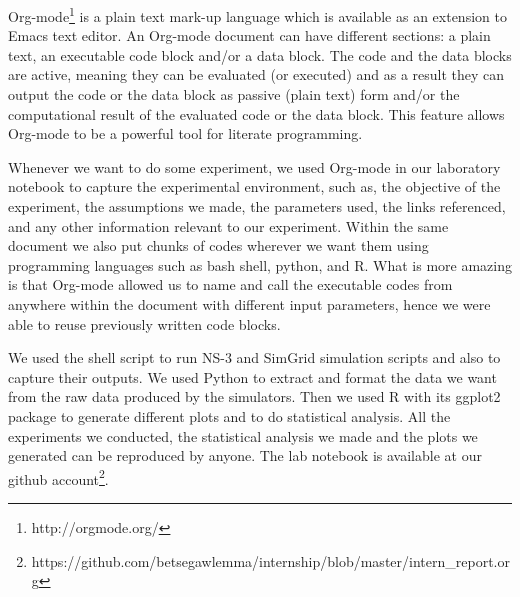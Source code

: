 Org-mode\footnote{http://orgmode.org/} is a plain text mark-up language which is available as an extension to Emacs text editor. An Org-mode document can have different sections: a plain text, an executable code block and/or a data block. The code and the data blocks are active, meaning they can be evaluated (or executed) and as a result they can output the code or the data block as passive (plain text) form and/or the computational result of the evaluated code or the data block. This feature allows Org-mode to be a powerful tool for literate programming.

Whenever we want to do some experiment, we used Org-mode in our laboratory notebook to capture the experimental environment, such as, the objective of the experiment, the assumptions we made, the parameters used, the links referenced, and any other information relevant to our experiment. Within the same document we also put chunks of codes wherever we want them using programming languages such as bash shell, python, and R. What is more amazing is that Org-mode allowed us to name and call the executable codes from anywhere within the document with different input parameters, hence we were able to reuse previously written code blocks. 

We used the shell script to run NS-3 and SimGrid simulation scripts and also to capture their outputs. We used Python to extract and format the data we want from the raw data produced by the simulators. Then we used R with its ggplot2 package to generate different plots and to do statistical analysis. All the experiments we conducted, the statistical analysis we made and the plots we generated can be reproduced by anyone. The lab notebook is available at our github account\footnote{https://github.com/betsegawlemma/internship/blob/master/intern{\_}report.org}.



